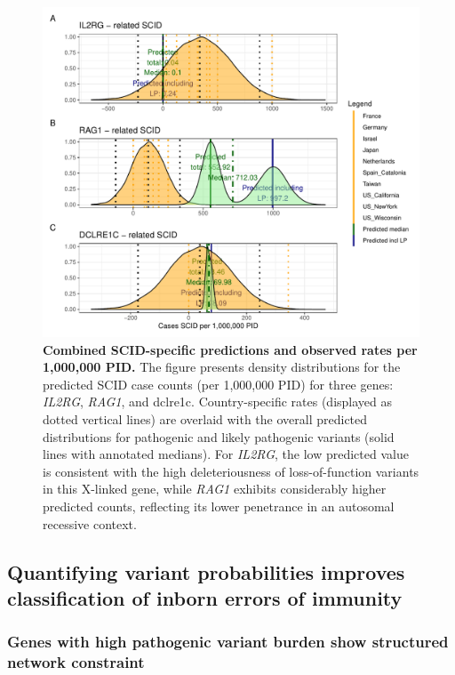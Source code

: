 \begin{figure}[h]
  \centering
  \includegraphics[width=.6\textwidth]{../images/validation_studies_scid_combined_plot.pdf}
  \caption{\textbf{Combined SCID-specific predictions and observed rates per 1,000,000 PID.}
    The figure presents density distributions for the predicted SCID case counts (per 1,000,000 PID) for three genes: \textit{IL2RG}, \textit{RAG1}, and \ac{dclre1c}. Country-specific rates (displayed as dotted vertical lines) are overlaid with the overall predicted distributions for pathogenic and likely pathogenic variants (solid lines with annotated medians). For \textit{IL2RG}, the low predicted value is consistent with the high deleteriousness of loss-of-function variants in this X-linked gene, while \textit{RAG1} exhibits considerably higher predicted counts, reflecting its lower penetrance in an autosomal recessive context.}
  \label{fig:scid_combined}
\end{figure}

\FloatBarrier
\clearpage

\subsection{Quantifying variant probabilities improves classification of inborn errors of immunity}
\subsubsection{Genes with high pathogenic variant burden show structured network constraint}

